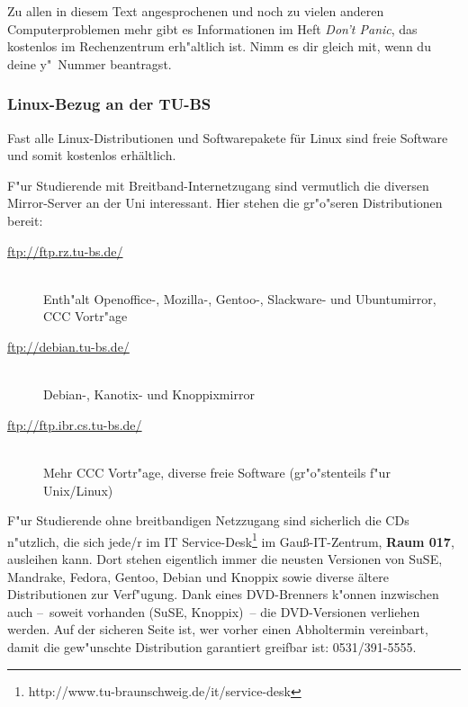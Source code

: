 \begin{multicols}{2}
		Zu allen in diesem Text angesprochenen und noch zu vielen anderen Computerproblemen mehr gibt es Informationen im Heft \emph{Don't Panic}, das kostenlos im Rechenzentrum erh"altlich ist. Nimm es dir gleich mit, wenn du deine y"~Nummer beantragst.

	\subsubsection{Linux-Bezug an der TU-BS}
		Fast alle Linux-Distributionen und Softwarepakete für Linux sind freie Software und somit kostenlos erhältlich.

		F"ur Studierende mit Breitband-Internetzugang sind vermutlich die diversen Mirror-Server an der Uni interessant. Hier stehen die gr"o"seren Distributionen bereit:
	  
		\begin{description}
			\item[\url{ftp://ftp.rz.tu-bs.de/}]~\\Enth"alt Openoffice-, Mozilla-, Gentoo-, Slackware- und Ubuntumirror, CCC Vortr"age
			\item[\url{ftp://debian.tu-bs.de/}]~\\Debian-, Kanotix- und Knoppixmirror
			\item[\url{ftp://ftp.ibr.cs.tu-bs.de/}]~\\Mehr CCC Vortr"age, diverse freie Software (gr"o"stenteils f"ur Unix/Linux)
		\end{description}

		F"ur Studierende ohne breitbandigen Netzzugang sind sicherlich die CDs n"utzlich, die sich jede/r im IT Service-Desk\footnote{http://www.tu-braunschweig.de/it/service-desk} im Gauß-IT-Zentrum, \textbf{Raum 017}, ausleihen kann. Dort stehen eigentlich immer die neusten Versionen von SuSE, Mandrake, Fedora, Gentoo, Debian und Knoppix sowie diverse ältere Distributionen zur Verf"ugung. Dank eines DVD-Brenners k"onnen inzwischen auch --~soweit vorhanden (SuSE, Knoppix)~-- die DVD-Versionen verliehen werden. Auf der sicheren Seite ist, wer vorher einen Abholtermin vereinbart, damit die gew"unschte Distribution garantiert greifbar ist: 0531/391-5555.
\end{multicols}